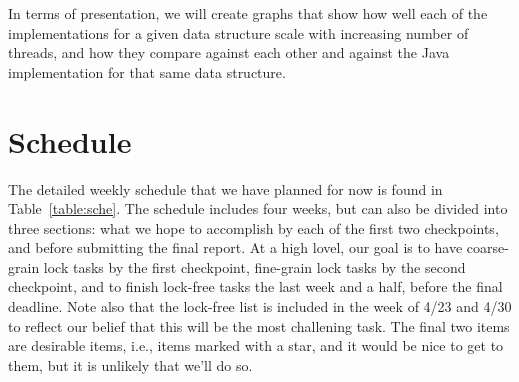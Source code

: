 \documentclass[11pt]{article}
\begin{document}
In terms of presentation, we will create graphs that show how well each of the
implementations for a given data structure scale with increasing number of
threads, and how they compare against each other and against the Java
implementation for that same data structure.

\section*{Schedule}
The detailed weekly schedule that we have planned for now is found in
Table~\ref{table:sche}. The schedule includes four weeks, but can also be
divided into three sections: what we hope to accomplish by each of the first two
checkpoints, and before submitting the final report. At a high lovel, our goal
is to have coarse-grain lock tasks by the first checkpoint, fine-grain lock
tasks by the second checkpoint, and to finish lock-free tasks the last week and
a half, before the final deadline. Note also that the lock-free list is included
in the week of 4/23 and 4/30 to reflect our belief that this will be the most
challening task. The final two items are desirable items, i.e., items marked
with a star, and it would be nice to get to them, but it is unlikely that we'll
do so.
\end{document}
